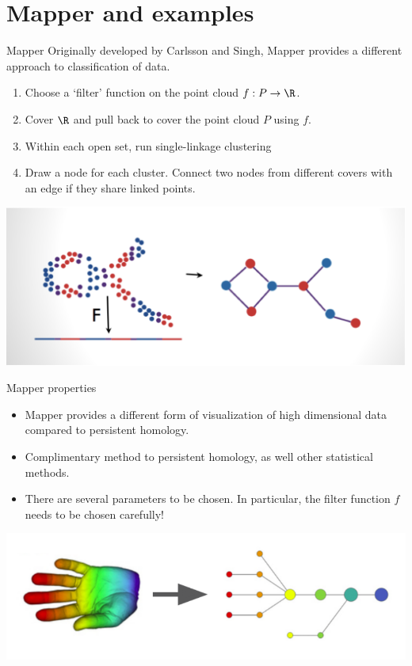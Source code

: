 \documentclass[usenames,dvipsnames,aspectratio=1610]{beamer}
\newcommand{\ra}{\rightarrow}
\begin{document}
\section{Mapper and examples}
\begin{frame}{Mapper}
  Originally developed by Carlsson and Singh, Mapper provides a different approach
  to classification of data.

  \begin{enumerate}
    \item Choose a `filter' function on the point cloud $f:P \ra \R$.
    \item Cover $\R$ and pull back to cover the point cloud $P$ using $f$.
    \item Within each open set, run single-linkage clustering
    \item Draw a node for each cluster. Connect two nodes from different covers with an edge if they share linked points.
  \end{enumerate}

  \begin{center}
    \includegraphics[scale=0.2]{images/mapper1.png}
  \end{center}
\end{frame}

\begin{frame}{Mapper properties}
 \begin{itemize}
   \item Mapper provides a different form of visualization of high dimensional
     data compared to persistent homology.
   \item Complimentary method to persistent homology, as well other 
     statistical methods.
   \item There are several parameters to be chosen. In particular, 
     the {\color{red} filter function $f$} needs to be chosen carefully!
 \end{itemize}

 \begin{center}
   \includegraphics[scale=0.5]{images/mapper_hand.png}
 \end{center}
 \end{frame}
\end{document}
